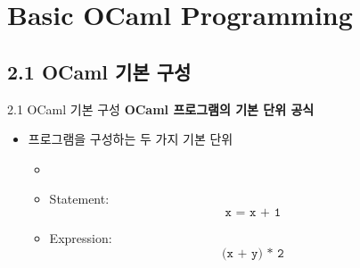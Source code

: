 \documentclass[10pt]{beamer}
\begin{document}

	\section{Basic OCaml Programming}
	\subsection{2.1 OCaml 기본 구성}
	\begin{frame}{2.1 OCaml 기본 구성}
		\textbf{OCaml 프로그램의 기본 단위 공식}
		
		\begin{itemize}
			\item 프로그램을 구성하는 두 가지 기본 단위
			\begin{itemize}
				\item[]
				\item[] Statement: \[
				\texttt{x = x + 1}
				\]
				\item[] Expression: \[
				\texttt{(x + y) * 2}
				\]
			\end{itemize}
		\end{itemize}
	\end{frame}
\end{document}
